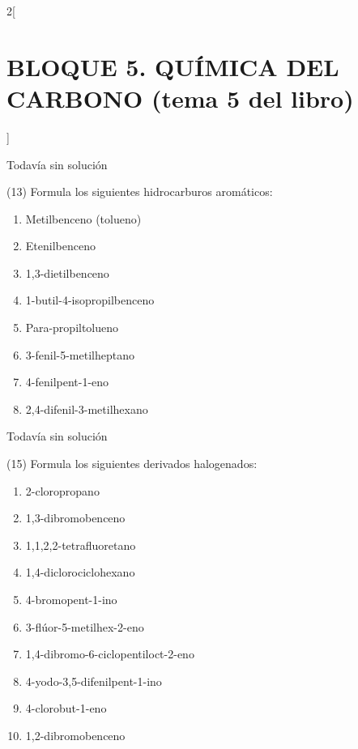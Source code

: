 \documentclass[10pt]{article}
\begin{document}
\begin{multicols}{2}[
  \section{BLOQUE 5. QUÍMICA DEL CARBONO (tema 5 del libro)}
  ]
\begin{solution}[print=false]
  Todavía sin solución
\end{solution}




\begin{exercise}[
    tags    = {},
    topics  = {química, química orgánica, orgánica},
    source  = {FQ 1B MGH 2016, p132, e13},
  ]
  (13) Formula los siguientes hidrocarburos aromáticos:
  \begin{enumerate}
    \item Metilbenceno (tolueno)
    \item Etenilbenceno
    \item 1,3-dietilbenceno
    \item 1-butil-4-isopropilbenceno
    \item Para-propiltolueno
    \item 3-fenil-5-metilheptano
    \item 4-fenilpent-1-eno
    \item 2,4-difenil-3-metilhexano
  \end{enumerate}
\end{exercise}

\begin{solution}[print=false]
  Todavía sin solución
\end{solution}




\begin{exercise}[
    tags    = {},
    topics  = {química, química orgánica, orgánica},
    source  = {FQ 1B MGH 2016, p133, e15},
  ]
  (15) Formula los siguientes derivados halogenados:
  \begin{enumerate}
    \item 2-cloropropano
    \item 1,3-dibromobenceno
    \item 1,1,2,2-tetrafluoretano
    \item 1,4-diclorociclohexano
    \item 4-bromopent-1-ino
    \item 3-flúor-5-metilhex-2-eno
    \item 1,4-dibromo-6-ciclopentiloct-2-eno
    \item 4-yodo-3,5-difenilpent-1-ino
    \item 4-clorobut-1-eno
    \item 1,2-dibromobenceno
  \end{enumerate}
\end{exercise}


\end{multicols}
\end{document}
